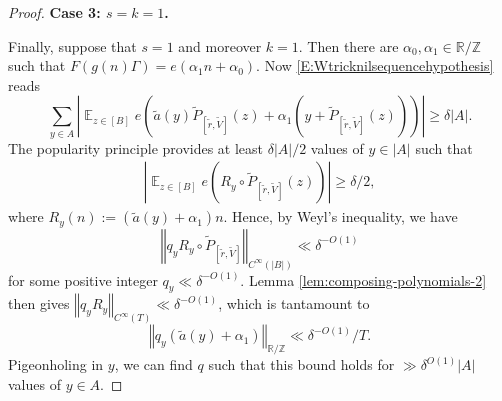 \documentclass[11pt]{amsart}
\theoremstyle{definition}
\DeclareMathOperator*{\E}{\mathbb{E}}
\newcommand{\norm}[1]{\left\Vert #1\right\Vert}
\newcommand{\abs}[1]{\mathopen{}\left| #1\mathclose{}\right|}
\begin{document}
\begin{proof}
\smallskip
{\textbf{Case 3: $s=k=1$.}}
\smallskip


Finally, suppose that $s=1$ and moreover $k=1$.  Then there are $\alpha_0,\alpha_1 \in \mathbb{R}/\mathbb{Z}$ such that $F(g(n)\Gamma)=e(\alpha_1 n+\alpha_0)$.  Now \eqref{E:Wtricknilsequencehypothesis} reads
$$\sum_{y \in A} \abs{\E_{z \in [B]} e(\tilde{a}(y)\widetilde{P}_{[\tilde{r}, \tilde{V}]}(z) + \alpha_1 (y + \widetilde{P}_{[\tilde{r}, \tilde{V}]}(z)))} \ge \delta |A|.$$
The popularity principle provides at least $\delta|A|/2$ values of $y\in |A|$ such that
\begin{align*}
    \abs{\E_{z \in [B]} e(R_y\circ\widetilde{P}_{[\tilde{r}, \tilde{V}]}(z))}\geq \delta/2,
\end{align*}
where $R_y(n) := (\tilde{a}(y)+\alpha_1)n$.  Hence, by Weyl's inequality, we have $$\norm{q_y R_y\circ \widetilde{P}_{[\tilde{r}, \tilde{V}]}}_{C^\infty(|B|)}\ll \delta^{-O(1)}$$ for some positive integer $q_y\ll \delta^{-O(1)}$. Lemma \ref{lem:composing-polynomials-2} then gives $\norm{q_y R_y}_{C^\infty(T)}\ll \delta^{-O(1)}$, which is tantamount to
$$\norm{q_y(\tilde{a}(y)+\alpha_1)}_{\mathbb{R}/\mathbb{Z}} \ll \delta^{-O(1)}/T.$$
Pigeonholing in $y$, we can find $q$ such that this bound holds for $\gg \delta^{O(1)}|A|$ values of $y\in A$. 
\end{proof}
\end{document}
